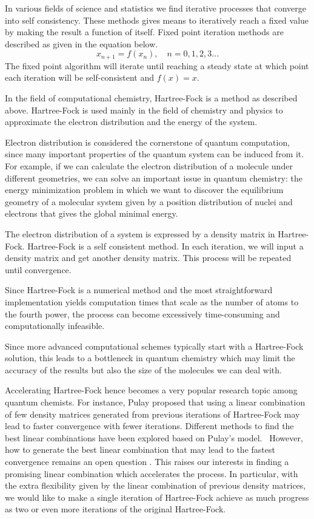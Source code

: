 \documentclass[twoside,11pt]{article}
\begin{document}
In various fields of science and statistics we find iterative processes that converge into self consistency. These methods gives means to iteratively reach a fixed value by making the result a function of itself. Fixed point iteration methods are described as given in the equation below.
\[
x_{n+1} = f(x_n), \quad n = 0,1,2,3...
\] 
The fixed point algorithm will iterate until reaching a steady state at which point each iteration will be self-consistent and $f(x)=x$.  

In the field of computational chemistry, Hartree-Fock is a method as described above. Hartree-Fock is used mainly in the field of chemistry and physics to approximate the electron distribution and the energy of the system. 

Electron distribution is considered the cornerstone of quantum computation, since many important properties of the quantum system can be induced from it. For example, if we can calculate the electron distribution of a molecule under different geometries, we can solve an important issue in quantum chemistry: the energy minimization problem in which we want to discover the equilibrium geometry of a molecular system given by a position distribution of nuclei and electrons that gives the global minimal energy. 

 
The electron distribution of a system is expressed by a density matrix in Hartree-Fock. Hartree-Fock is a self consistent method. In each iteration, we will input a density matrix and get another density matrix. This process will be repeated until convergence.

Since Hartree-Fock is a numerical method and the most straightforward implementation yields computation times that scale as the number of atoms to the fourth power, the process can become excessively time-consuming and computationally infeasible.

Since more advanced computational schemes typically start with a Hartree-Fock solution, this leads to a bottleneck in quantum chemistry which may limit the accuracy of the results but also the size of the molecules we can deal with.

Accelerating Hartree-Fock hence becomes a very popular research topic among quantum chemists. For instance, Pulay \citep{Pulay1980} proposed that using a linear combination of few density matrices generated from previous iterations of Hartree-Fock may lead to faster convergence with fewer iterations. Different methods to find the best linear combinations have been explored based on Pulay's model.~\citep{ADIIS,compScuseria} However, how to generate the best linear combination that may lead to the fastest convergence remains an open question \citep{Konstantin2002, Thorsten2011, Alejandro2012}. This raises our interests in finding a promising linear combination which accelerates the process. In particular, with the extra flexibility given by the linear combination of previous density matrices, we would like to make a single iteration of Hartree-Fock achieve as much progress as two or even more iterations of the original Hartree-Fock.
\end{document}
